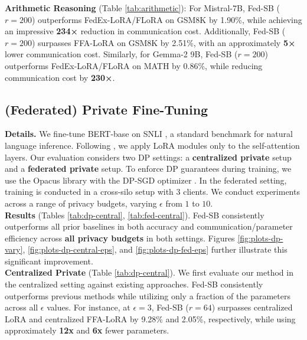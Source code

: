 \textbf{Arithmetic Reasoning} (Table \ref{tab:arithmetic}): For Mistral-7B, Fed-SB ($r=200$) outperforms FedEx-LoRA/FLoRA on GSM8K by 1.90\%, while achieving an impressive \textbf{234×} reduction in communication cost. 
Additionally, Fed-SB ($r=200$) surpasses FFA-LoRA on GSM8K by 2.51\%, with an approximately \textbf{5×} lower communication cost.
Similarly, for Gemma-2 9B, Fed-SB ($r=200$) outperforms FedEx-LoRA/FLoRA on MATH by 0.86\%, while reducing communication cost by \textbf{230×}.


\subsection{(Federated) Private Fine-Tuning}



\quad \textbf{Details.}
We fine-tune BERT-base \citep{devlin2018bert} on SNLI \citep{bowman2015snli}, a standard benchmark for natural language inference. 
Following \citet{lora}, we apply LoRA modules only to the self-attention layers.  
Our evaluation considers two DP settings: a \textbf{centralized private} setup and a \textbf{federated private} setup. 
To enforce DP guarantees during training, we use the Opacus library \citep{yousefpour2021opacus} with the DP-SGD optimizer \citep{dgsgd}.  
In the federated setting, training is conducted in a cross-silo setup with $3$ clients.
We conduct experiments across a range of privacy budgets, varying $\epsilon$ from $1$ to $10$. 
\\

\textbf{Results} (Tables \ref{tab:dp-central}, \ref{tab:fed-central}).
Fed-SB consistently outperforms all prior baselines in both accuracy and communication/parameter efficiency across \textbf{all privacy budgets} in both settings. 
Figures \ref{fig:plots-dp-vary}, \ref{fig:plots-dp-central-eps}, and \ref{fig:plots-dp-fed-eps} further illustrate this significant improvement.
\\

\textbf{Centralized Private} (Table \ref{tab:dp-central}).
We first evaluate our method in the centralized setting against existing approaches. 
Fed-SB consistently outperforms previous methods while utilizing only a fraction of the parameters across all $\epsilon$ values. 
For instance, at $\epsilon=3$, Fed-SB ($r=64$) surpasses centralized LoRA and centralized FFA-LoRA by 9.28\% and 2.05\%, respectively, while using approximately \textbf{12x} and \textbf{6x} fewer parameters.
\\

